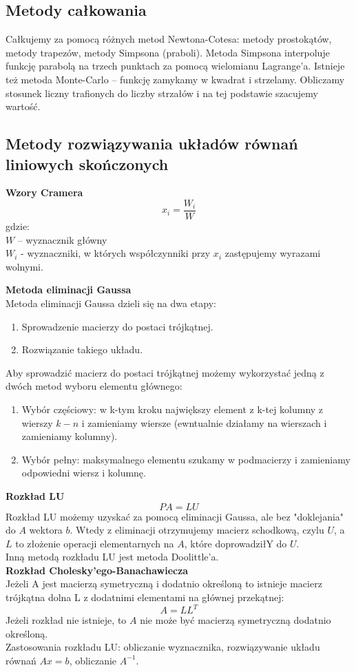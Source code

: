 \documentclass[12pt]{article}
\begin{document}
\subsection{Metody całkowania}
Całkujemy za pomocą różnych metod Newtona-Cotesa: metody prostokątów, metody trapezów, metody Simpsona (praboli). Metoda Simpsona interpoluje funkcję parabolą na trzech punktach za pomocą wielomianu Lagrange'a. Istnieje też metoda Monte-Carlo -- funkcję zamykamy w kwadrat i strzelamy. Obliczamy stosunek liczny trafionych do liczby strzałów i na tej podstawie szacujemy wartość.

\subsection{Metody rozwiązywania układów równań liniowych skończonych}
\textbf{Wzory Cramera}\\
$$x_{i} = \frac{W_{i}}{W}$$ gdzie:\\
$W$ -- wyznacznik główny\\
$W_{i}$ - wyznaczniki, w których współczynniki przy $x_{i}$ zastępujemy wyrazami wolnymi.

\textbf{Metoda eliminacji Gaussa}\\
Metoda eliminacji Gaussa dzieli się na dwa etapy:
\begin{enumerate}
	\item Sprowadzenie macierzy do postaci trójkątnej.
	\item Rozwiązanie takiego układu.
\end{enumerate}
Aby sprowadzić macierz do postaci trójkątnej możemy wykorzystać jedną z dwóch metod wyboru elementu głównego:
\begin{enumerate}
	\item Wybór częściowy: w k-tym kroku największy element z k-tej kolumny z wierszy $k-n$ i zamieniamy wiersze (ewntualnie działamy na wierszach i zamieniamy kolumny).
	\item Wybór pełny: maksymalnego elementu szukamy w podmacierzy i zamieniamy odpowiedni wiersz i kolumnę.
\end{enumerate}

\textbf{Rozkład LU}
$$PA = LU$$
Rozkład LU możemy uzyskać za pomocą eliminacji Gaussa, ale bez "doklejania" do $A$ wektora $b$. Wtedy z eliminacji otrzymujemy macierz schodkową, czylu $U$, a $L$ to złożenie operacji elementarnych na $A$, które doprowadziłY do $U$.\\
Inną metodą rozkładu LU jest metoda Doolittle'a.
~\\
\textbf{Rozkład Cholesky'ego-Banachawiecza}\\
Jeżeli A jest macierzą symetryczną i dodatnio określoną to istnieje macierz trójkątna dolna L z dodatnimi elementami na głównej przekątnej:
$$A = LL^{T}$$
Jeżeli rozkład nie istnieje, to $A$ nie może być macierzą symetryczną dodatnio określoną.\\
Zastosowania rozkładu LU: obliczanie wyznacznika, rozwiązywanie układu równań $Ax = b$, obliczanie $A^{-1}$.
\end{document}

